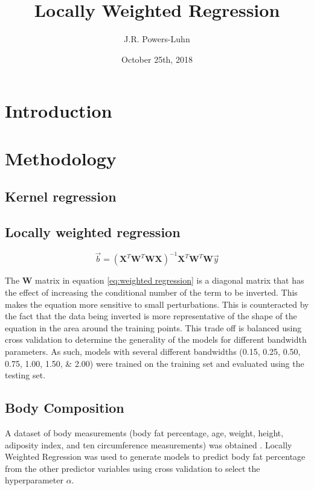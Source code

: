 \documentclass{IEEEtran}
\author{J.R. Powers-Luhn}
\title{Locally Weighted Regression}
\date{October 25th, 2018}
\begin{document}
\maketitle

\begin{abstract}



\end{abstract}

\section{Introduction}



\section{Methodology}

\subsection{Kernel regression}

\subsection{Locally weighted regression}

\begin{equation}
\vec{b} = (\mathbf{X}^T  \mathbf{W}^T  \mathbf{W}  \mathbf{X})^{-1} \mathbf{X}^T \mathbf{W}^T \mathbf{W} \vec{y}
\label{eq:weighted regression}
\end{equation}

The $\mathbf{W}$ matrix in equation \ref{eq:weighted regression} is a diagonal matrix that has the effect of increasing the 
conditional number of the term to be inverted. This makes the equation more sensitive to small perturbations. This is counteracted 
by the fact that the data being inverted is more representative of the shape of the equation in the area around the training points. 
This trade off is balanced using cross validation to determine the generality of the models for different bandwidth parameters. 
As such, models with several different bandwidths (\numlist{0.15; 0.25; 0.50; 0.75; 1.00; 1.50; 2.00}) were trained on the training 
set and evaluated using the testing set.

\subsection{Body Composition}
A dataset of body measurements (body fat percentage, age, weight, height, adiposity index, and ten 
circumference measurements) was obtained \cite{Penrose1985}. Locally Weighted Regression was used to generate models to 
predict body fat percentage from the other predictor variables using cross validation to select 
the hyperparameter $\alpha$.
\end{document}

